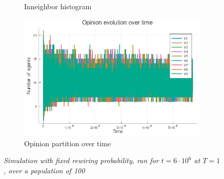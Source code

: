 \documentclass[12pt,openright,twoside]{book}
\begin{document}
\begin{appendices}
\begin{figure}[!htb]
\begin{subfigure}{0.47\linewidth}
    \caption{Inneighbor histogram}
\end{subfigure}
\begin{subfigure}{0.47\linewidth}
    \includegraphics[width=\linewidth]{figures/2_2_t1/vote_evolution.png}
    \caption{Opinion partition over time}
\end{subfigure}
\caption{\textit{{\small Simulation with fixed rewiring probability, ran for $t=6\cdot 10^6$ at $T=1$, over a population of 100}}}
\label{2_2_t1}
\end{figure}


\end{appendices}
\end{document}
